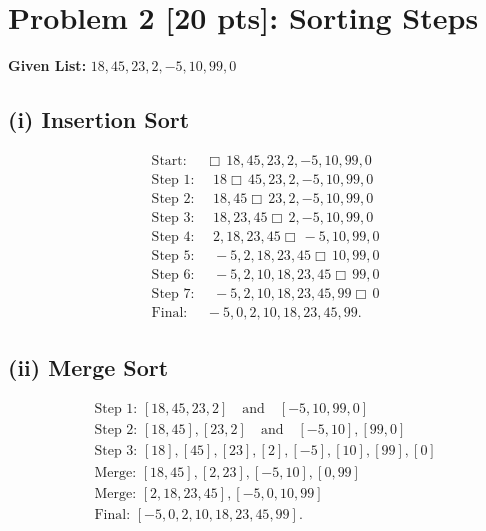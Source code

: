 \documentclass[10pt]{article}
\begin{document}
\section*{Problem 2 [20 pts]: Sorting Steps}

\textbf{Given List:} \( 18, 45, 23, 2, -5, 10, 99, 0 \)

\subsection*{(i) Insertion Sort}
\[
  \begin{aligned}
    &\text{Start: } \quad \Box \, 18, 45, 23, 2, -5, 10, 99, 0 \\
    &\text{Step 1: } \quad 18 \Box \, 45, 23, 2, -5, 10, 99, 0 \\
    &\text{Step 2: } \quad 18, 45 \Box \, 23, 2, -5, 10, 99, 0 \\
    &\text{Step 3: } \quad 18, 23, 45 \Box \, 2, -5, 10, 99, 0 \\
    &\text{Step 4: } \quad 2, 18, 23, 45 \Box \, -5, 10, 99, 0 \\
    &\text{Step 5: } \quad -5, 2, 18, 23, 45 \Box \, 10, 99, 0 \\
    &\text{Step 6: } \quad -5, 2, 10, 18, 23, 45 \Box \, 99, 0 \\
    &\text{Step 7: } \quad -5, 2, 10, 18, 23, 45, 99 \Box \, 0 \\
    &\text{Final: } \quad -5, 0, 2, 10, 18, 23, 45, 99.
  \end{aligned}
\]

\subsection*{(ii) Merge Sort}
\[
  \begin{aligned}
    &\text{Step 1: } [18, 45, 23, 2] \quad \text{and} \quad [-5, 10, 99, 0] \\
    &\text{Step 2: } [18, 45], [23, 2] \quad \text{and} \quad [-5, 10], [99, 0] \\
    &\text{Step 3: } [18], [45], [23], [2], [-5], [10], [99], [0] \\
    &\text{Merge: } [18, 45], [2, 23], [-5, 10], [0, 99] \\
    &\text{Merge: } [2, 18, 23, 45], [-5, 0, 10, 99] \\
    &\text{Final: } [-5, 0, 2, 10, 18, 23, 45, 99].
  \end{aligned}
\]

\newpage
\end{document}
